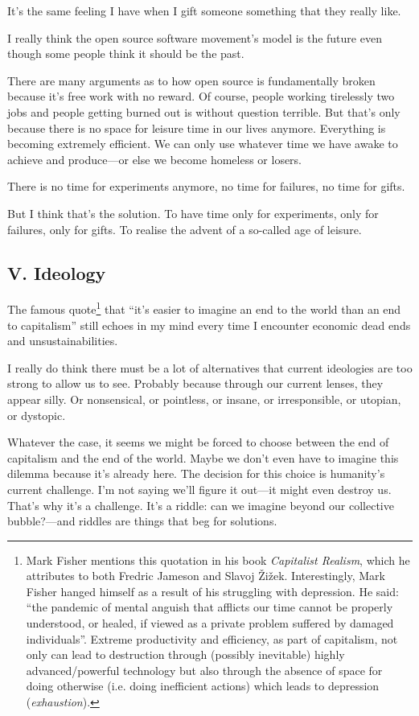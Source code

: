 It’s the same feeling I have when I gift someone something that they really like.

I really think the open source software movement’s model is the future even though some people think it should be the past.

There are many arguments as to how open source is fundamentally broken because it’s free work with no reward. Of course, people working tirelessly two jobs and people getting burned out is without question terrible. But that’s only because there is no space for leisure time in our lives anymore. Everything is becoming extremely efficient. We can only use whatever time we have awake to achieve and produce—or else we become homeless or losers.

There is no time for experiments anymore, no time for failures, no time for gifts.

But I think that’s the solution. To have time only for experiments, only for failures, only for gifts. To realise the advent of a so-called age of leisure.

\subsection{V. Ideology}

The famous quote\footnote{Mark Fisher mentions this quotation in his book \emph{Capitalist Realism}, which he attributes to both Fredric Jameson and Slavoj Žižek. Interestingly, Mark Fisher hanged himself as a result of his struggling with depression. He said: “the pandemic of mental anguish that afflicts our time cannot be properly understood, or healed, if viewed as a private problem suffered by damaged individuals”. Extreme productivity and efficiency, as part of capitalism, not only can lead to destruction through (possibly inevitable) highly advanced/powerful technology but also through the absence of space for doing otherwise (i.e. doing inefficient actions) which leads to depression (\emph{exhaustion}).} that “it’s easier to imagine an end to the world than an end to capitalism” still echoes in my mind every time I encounter economic dead ends and unsustainabilities.

I really do think there must be a lot of alternatives that current ideologies are too strong to allow us to see. Probably because through our current lenses, they appear silly. Or nonsensical, or pointless, or insane, or irresponsible, or utopian, or dystopic.

Whatever the case, it seems we might be forced to choose between the end of capitalism and the end of the world. Maybe we don’t even have to imagine this dilemma because it’s already here. The decision for this choice is humanity’s current challenge. I’m not saying we’ll figure it out—it might even destroy us. That’s why it’s a challenge. It’s a riddle: can we imagine beyond our collective bubble?—and riddles are things that beg for solutions.

